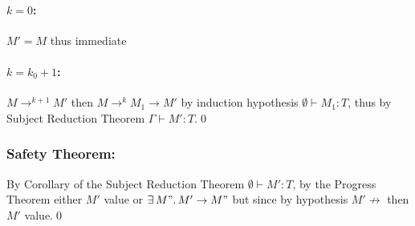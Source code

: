 \paragraph*{$k = 0$:} $M' = M$ thus immediate
\paragraph*{$k = k_0 + 1$:\\}
$M \to^{k+1} M'$ then $M \to^k M_1 \to M'$ by induction hypothesis $\emptyset \vdash M_1: T$,
thus by Subject Reduction Theorem $\Gamma \vdash M': T$.\qed

\subsubsection*{Safety Theorem:}

By Corollary of the Subject Reduction Theorem $\emptyset \vdash M': T$, by the Progress Theorem
either $M'$ value or $\exists\, M".\, M' \to M"$ but since by hypothesis $M' \not\to$ then
$M'$ value.\qed
